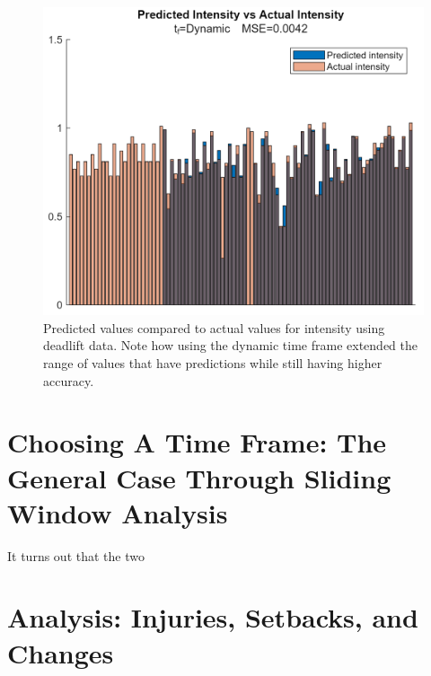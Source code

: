 \begin{figure}[h]
    \centering
    \includegraphics[width=120mm]{ActualVsPredValues/DynamicTimeFrameActualVsPredIntensity.png}
    \caption{Predicted values compared to actual values for intensity using deadlift data. Note how using the dynamic time frame extended the range of values that have predictions while still having higher accuracy.}
    \label{fig:PredictionsVsActualDynamicTimeFrame}
\end{figure}


\section{Choosing A Time Frame: The General Case Through Sliding Window Analysis}
\label{sec:TimeFrameSlidingWindowAnalysis}

It turns out that the two 

\section{Analysis: Injuries, Setbacks, and Changes}
\label{sec:TimeFrameInjuriesAndChanges}

